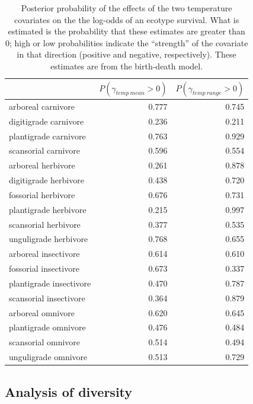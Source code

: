 \documentclass[12pt,letterpaper]{article}
\begin{document}
\begin{table}[ht]
  \centering
  \caption[Posterior probablity of effects of temperature on survival]{Posterior probability of the effects of the two temperature covariates on the the log-odds of an ecotype survival. What is estimated is the probability that these estimates are greater than 0; high or low probabilities indicate the ``strength'' of the covariate in that direction (positive and negative, respectively). These estimates are from the birth-death model.}
  \label{tab:surv_temp}
  \begin{tabular}{ l r r }
    \hline
    & \(P(\gamma_{temp\ mean} > 0)\) & \(P(\gamma_{temp\ range} > 0)\) \\ 
    \hline
    arboreal carnivore & 0.777 & 0.745 \\ 
    digitigrade carnivore & 0.236 & 0.211 \\ 
    plantigrade carnivore & 0.763 & 0.929 \\ 
    scansorial carnivore & 0.596 & 0.554 \\ 
    arboreal herbivore & 0.261 & 0.878 \\ 
    digitigrade herbivore & 0.438 & 0.720 \\ 
    fossorial herbivore & 0.676 & 0.731 \\ 
    plantigrade herbivore & 0.215 & 0.997 \\ 
    scansorial herbivore & 0.377 & 0.535 \\ 
    unguligrade herbivore & 0.768 & 0.655 \\ 
    arboreal insectivore & 0.614 & 0.610 \\ 
    fossorial insectivore & 0.673 & 0.337 \\ 
    plantigrade insectivore & 0.470 & 0.787 \\ 
    scansorial insectivore & 0.364 & 0.879 \\ 
    arboreal omnivore & 0.620 & 0.645 \\ 
    plantigrade omnivore & 0.476 & 0.484 \\ 
    scansorial omnivore & 0.514 & 0.494 \\ 
    unguligrade omnivore & 0.513 & 0.729 \\ 
    \hline
  \end{tabular}
\end{table}





\subsection*{Analysis of diversity}
\end{document}
